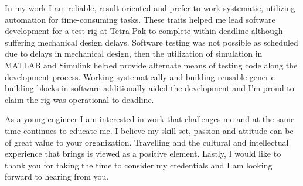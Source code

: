 \documentclass[11pt,a4paper,sans]{moderncv} %
\begin{document}

In my work I am reliable, result oriented and prefer to work systematic, utilizing automation for time-consuming tasks. 
These traits helped me lead software development for a test rig at Tetra Pak to complete within deadline although suffering mechanical design delays. 
Software testing was not possible as scheduled due to delays in mechanical design, then the utilization of simulation in MATLAB and Simulink helped provide alternate  means of testing code along the development process. 
Working systematically and building reusable generic building blocks in software additionally aided the development and I'm proud to claim the rig was operational to deadline.


As a young engineer I am interested in work that challenges me and at the same time continues to educate me. 
I believe my skill-set, passion and attitude can be of great value to your organization.
Travelling and the cultural and intellectual experience that brings is viewed as a positive element.
\newline
Lastly, I would like to thank you for taking the time to consider my credentials and I am looking forward to hearing from you.


\makeletterclosing %

\end{document}
